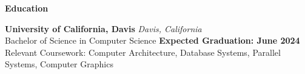 \documentclass[11pt]{article}
\begin{document}

\begin{center}
    \textbf{Education}
\end{center}
\textbf{University of California, Davis} \hfill \textit{Davis, California}\\
Bachelor of Science in Computer Science \hfill \textbf{Expected Graduation: June 2024}\\
Relevant Coursework: Computer Architecture, Database Systems, Parallel Systems, Computer Graphics
\vspace{8pt}
\end{document}
